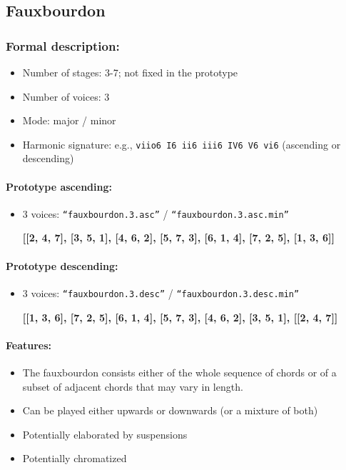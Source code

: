 \documentclass[11pt, openany]{article}
\begin{document}
	\subsection{Fauxbourdon}
	
\subsubsection{Formal description:}
\begin{itemize}
\item Number of stages: 3-7; not fixed in the prototype
\item Number of voices: 3
\item Mode: major / minor
\item Harmonic signature: e.g., \texttt{viio6 I6 ii6 iii6 IV6 V6 vi6} (ascending or descending)
\end{itemize}

\paragraph{Prototype ascending:}
\begin{itemize}
\item 3 voices: \texttt{“fauxbourdon.3.asc”} / \texttt{“fauxbourdon.3.asc.min”}
	\begin{center}
	\textbf{[[2, 4, 7], [3, 5, 1], [4, 6, 2], [5, 7, 3], [6, 1, 4], [7, 2, 5], [1, 3, 6]]}
    \end{center}
\end{itemize}

\paragraph{Prototype descending:}
\begin{itemize}
\item 3 voices: \texttt{“fauxbourdon.3.desc”} / \texttt{“fauxbourdon.3.desc.min”}
	\begin{center}
	\textbf{[[1, 3, 6], [7, 2, 5], [6, 1, 4], [5, 7, 3], [4, 6, 2], [3, 5, 1], [[2, 4, 7]]}
    \end{center}
\end{itemize}

\paragraph{Features:}
\begin{itemize}
\item The fauxbourdon consists either of the whole sequence of chords or of a subset of adjacent chords that may vary in length.
\item Can be played either upwards or downwards (or a mixture of both)
\item Potentially elaborated by suspensions
\item Potentially chromatized
\end{itemize}
\end{document}
